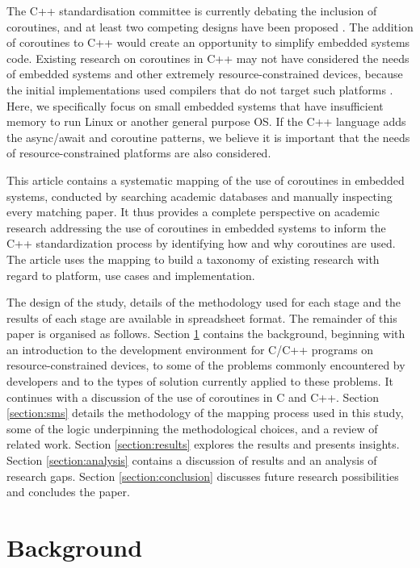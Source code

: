The C++ standardisation committee is currently debating the inclusion of coroutines, and at least two competing designs have been proposed \cite{ISO2017, Romer2018}. The addition of coroutines to C++ would create an opportunity to simplify embedded systems code. Existing research on coroutines in C++ may not have considered the needs of embedded systems and other extremely resource-constrained devices, because the initial implementations used compilers that do not target such platforms \cite{Mittelette2015}. Here, we specifically focus on small embedded systems that have insufficient memory to run Linux or another general purpose OS. If the C++ language adds the async/await and coroutine patterns, we believe it is important that the needs of resource-constrained platforms are also considered.

This article contains a systematic mapping of the use of coroutines in embedded systems, conducted by searching academic databases and manually inspecting every matching paper. It thus provides a complete perspective on academic research addressing the use of coroutines in embedded systems to inform the C++ standardization process by identifying how and why coroutines are used. The article uses the mapping to build a taxonomy of existing research with regard to platform, use cases and implementation.

The design of the study, details of the methodology used for each stage and the results of each stage are available in spreadsheet format.
The remainder of this paper is organised as follows. Section \ref{section:background} contains the background, beginning with an introduction to the development environment for C/C++ programs on resource-constrained devices, to some of the problems commonly encountered by developers and to the types of solution currently applied to these problems. It continues with a discussion of the use of coroutines in C and C++. Section \ref{section:sms} details the methodology of the mapping process used in this study, some of the logic underpinning the methodological choices, and a review of related work. Section \ref{section:results} explores the results and presents insights. Section \ref{section:analysis} contains a discussion of results and an analysis of research gaps. Section \ref{section:conclusion} discusses future research possibilities and concludes the paper.


\section{Background}
\label{section:background}


